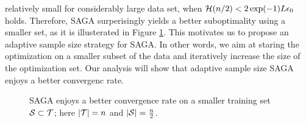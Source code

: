 \documentclass{article}
\begin{document}
relatively small for considerably large data set, when $\bound(n/2)<2 \exp(-1) L\epsilon_0$ holds.
	Therefore, SAGA surperisingly yields a better
	suboptimality using a smaller set, as it is illusterated in Figure
	\ref{fig:geometric}. This motivates us to propose an adaptive sample size
	strategy for SAGA.
	In other words, we aim at staring the optimization on a smaller subset of
	the data and iteratively increase the size of the optimization set.
	Our analysis will show that adaptive sample size SAGA enjoys a better convergenc rate. 
\begin{figure}
    \begin{center}
    \end{center}
    \caption{SAGA enjoys a better convergence rate on a smaller training set
    $\S \subset \T$; here $|\T| = n$ and $|\S| = \frac{n}{2}$. }
  \label{fig:geometric}
\end{figure}
\end{document}

